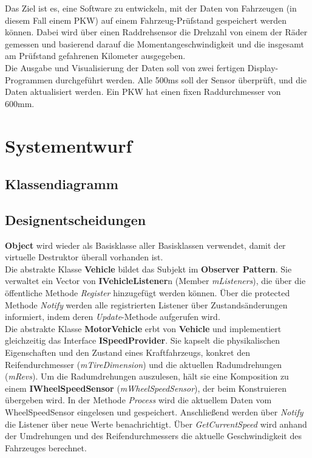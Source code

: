  Das Ziel ist es, eine Software zu entwickeln, mit der Daten von Fahrzeugen (in diesem Fall einem PKW) auf einem Fahrzeug-Prüfstand gespeichert werden können. Dabei wird über einen Raddrehsensor die Drehzahl von einem der Räder gemessen und basierend darauf die Momentangeschwindigkeit und die insgesamt am Prüfstand gefahrenen Kilometer ausgegeben.\\
 Die Ausgabe und Visualisierung der Daten soll von zwei fertigen Display-Programmen durchgeführt werden.
 Alle 500ms soll der Sensor überprüft, und die Daten aktualisiert werden. Ein PKW hat einen fixen Raddurchmesser von 600mm. 
 
\section{Systementwurf}

\subsection{Klassendiagramm}

\subsection{Designentscheidungen}

\textbf{Object} wird wieder als Basisklasse aller Basisklassen verwendet, damit der virtuelle Destruktor überall vorhanden ist.\\

Die abstrakte Klasse \textbf{Vehicle} bildet das Subjekt im \textbf{Observer Pattern}. Sie verwaltet ein Vector von \textbf{IVehicleListener}n (Member \textit{mListeners}), die über die öffentliche Methode \textit{Register} hinzugefügt werden können. Über die protected Methode \textit{Notify} werden alle registrierten Listener über Zustandsänderungen informiert, indem deren \textit{Update}-Methode aufgerufen wird.\\

Die abstrakte Klasse \textbf{MotorVehicle} erbt von \textbf{Vehicle} und implementiert gleichzeitig das Interface \textbf{ISpeedProvider}. Sie kapselt die physikalischen Eigenschaften und den Zustand eines Kraftfahrzeugs, konkret den Reifendurchmesser (\textit{mTireDimension}) und die aktuellen Radumdrehungen (\textit{mRevs}). Um die Radumdrehungen auszulesen, hält sie eine Komposition zu einem \textbf{IWheelSpeedSensor} (\textit{mWheelSpeedSensor}), der beim Konstruieren übergeben wird. In der Methode \textit{Process} wird die aktuellem Daten vom WheelSpeedSensor eingelesen und gespeichert. Anschließend werden über \textit{Notify} die Listener über neue Werte benachrichtigt. Über \textit{GetCurrentSpeed} wird anhand der Umdrehungen und des Reifendurchmessers die aktuelle Geschwindigkeit des Fahrzeuges berechnet.\\

